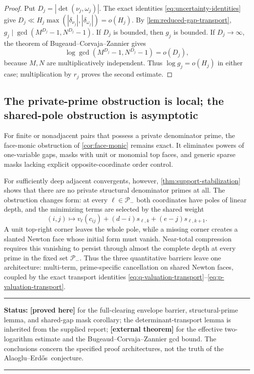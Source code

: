 \documentclass[11pt,oneside]{article}
\theoremstyle{definition}
\theoremstyle{remark}
\newcommand{\AEname}{Alaoglu--Erd\H{o}s}
\newcommand{\statusproved}{\textcolor{provedgreen}{\textbf{[proved here]}}}
\newcommand{\statusexternal}{\textcolor{externalblue}{\textbf{[external theorem]}}}
\newenvironment{statusbox}[1]
{\begin{center}\begin{minipage}{0.94\textwidth}\raggedright\hrule\vspace{0.45em}
\textbf{Status:} #1\par\vspace{0.35em}}
{\vspace{0.35em}\hrule\end{minipage}\end{center}}
\begin{document}
\begin{proof}
Put $D_j=|\det(\nu_j,\omega_j)|$.  The exact identities
\eqref{eq:uncertainty-identities} give
$D_j\ll H_j\max(|\delta_{\nu_j}|,|\delta_{\omega_j}|)=o(H_j)$.
By \cref{lem:reduced-gap-transport},
$g_j\mid\gcd(M^{D_j}-1,N^{D_j}-1)$.  If $D_j$ is bounded, then $g_j$ is bounded.  If
$D_j\to\infty$, the theorem of Bugeaud--Corvaja--Zannier gives
\[
 \log\gcd(M^{D_j}-1,N^{D_j}-1)=o(D_j),
\]
because $M,N$ are multiplicatively independent.  Thus $\log g_j=o(H_j)$ in either case;
multiplication by $r_j$ proves the second estimate.
\end{proof}

\subsection{The private-prime obstruction is local; the shared-pole obstruction is asymptotic}

For finite or nonadjacent pairs that possess a private denominator prime, the face-monic
obstruction of \cref{cor:face-monic} remains exact.  It eliminates powers of one-variable
gaps, masks with unit or monomial top faces, and generic sparse masks lacking explicit
opposite-coordinate order control.

For sufficiently deep adjacent convergents, however, \cref{thm:support-stabilization} shows
that there are no private structural denominator primes at all.  The obstruction changes
form: at every $\ell\in\mathcal P_-$ both coordinates have poles of linear depth, and the
minimizing terms are selected by the shared weight
\[
 (i,j)\longmapsto v_\ell(c_{ij})+(d-i)s_{\ell,k}+(e-j)s_{\ell,k+1}.
\]
A unit top-right corner leaves the whole pole, while a missing corner creates a slanted
Newton face whose initial form must vanish.  Near-total compression requires this vanishing
to persist through almost the complete depth at every prime in the fixed set
$\mathcal P_-$.  Thus the three quantitative barriers leave one architecture: multi-term,
prime-specific cancellation on shared Newton faces, coupled by the exact transport
identities \eqref{eq:q-valuation-transport}--\eqref{eq:p-valuation-transport}.

\begin{statusbox}{\statusproved{} for the full-clearing envelope barrier, structural-prime lemma, and
shared-gap mask corollary; the determinant-transport lemma is inherited from the supplied report; \statusexternal{} for the effective two-logarithm estimate and the
Bugeaud--Corvaja--Zannier gcd bound.  The conclusions concern the specified proof
architectures, not the truth of the \AEname\ conjecture.}
\end{statusbox}
\end{document}
